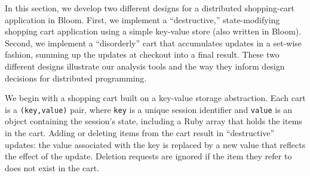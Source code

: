 In this section, we develop two different designs for a distributed shopping-cart
application in Bloom.  First, we implement a ``destructive,'' state-modifying
shopping cart application using a simple key-value store (also written in Bloom).
Second, we implement a ``disorderly'' cart that accumulates updates in a 
set-wise fashion, summing up the updates at checkout into a final result.  These two different designs illustrate our analysis tools and the way they inform design decisions for distributed programming.

We begin with a shopping cart built on a key-value storage abstraction.  Each
cart is a \texttt{(key,value)} pair, where \texttt{key} is a unique session
identifier and \texttt{value} is an object containing the session's state,
including a Ruby array that holds the items in the cart. Adding or deleting
items from the cart result in ``destructive'' updates: the value associated with
the key is replaced by a new value that reflects the effect of the
update. Deletion requests are ignored if the item they refer to does not exist
in the cart.

